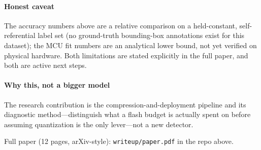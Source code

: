 \documentclass[11pt]{article}
\begin{document}
\paragraph{Honest caveat} The accuracy numbers above are a relative
comparison on a held-constant, self-referential label set (no
ground-truth bounding-box annotations exist for this dataset); the MCU fit
numbers are an analytical lower bound, not yet verified on physical
hardware. Both limitations are stated explicitly in the full paper, and
both are active next steps.

\paragraph{Why this, not a bigger model} The research contribution is the
compression-and-deployment pipeline and its diagnostic method---distinguish
what a flash budget is actually spent on before assuming quantization is
the only lever---not a new detector.

\vspace{0.3em}
\noindent Full paper (12 pages, arXiv-style): \texttt{writeup/paper.pdf} in the repo above.
\end{document}
